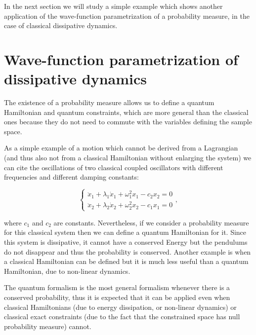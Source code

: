 \documentclass[11pt]{book}
\begin{document}
In the next section we will study a simple example which shows another
application of the wave-function parametrization of a probability
measure, in the case of classical dissipative dynamics.

\hypertarget{wave-function-parametrization-of-dissipative-dynamics}{%
\section{Wave-function parametrization of dissipative
dynamics}\label{wave-function-parametrization-of-dissipative-dynamics}}

The existence of a probability measure allows us to define a quantum
Hamiltonian and quantum constraints, which are more general than the
classical ones because they do not need to commute with the variables
defining the sample space.

As a simple example of a motion which cannot be derived from a
Lagrangian (and thus also not from a classical Hamiltonian without
enlarging the system) we can
cite\cite{razavy2005classical} the
oscillations of two classical coupled oscillators with different
frequencies and different damping constants:

\begin{equation}\left\{\begin{array}{l}
\ddot{x}_{1}+\lambda_{1} \dot{x}_{1}+\omega_{1}^{2} x_{1}-c_{2} x_{2}=0 \\
\ddot{x}_{2}+\lambda_{2} \dot{x}_{2}+\omega_{2}^{2} x_{2}-c_{1} x_{1}=0
\end{array}\right.,\end{equation}

where \(c_1\) and \(c_2\) are constants. Nevertheless, if we consider a
probability measure for this classical system then we can define a
quantum Hamiltonian for it. Since this system is dissipative, it cannot
have a conserved Energy but the pendulums do not disappear and thus the
probability is conserved. Another example is when a classical
Hamiltonian can be defined but it is much less useful than a quantum
Hamiltonian, due to non-linear
dynamics\cite{2012Chaos..22d7510B}\cite{book}.

The quantum formalism is the most general formalism whenever there is a
conserved probability, thus it is expected that it can be applied even
when classical Hamiltonians (due to energy
dissipation\cite{razavy2005classical},
or non-linear
dynamics\cite{2012Chaos..22d7510B}\cite{book}) or classical
exact constraints (due to the fact that the constrained space has null
probability measure) cannot.
\end{document}
